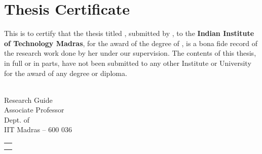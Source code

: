 \xclearpage%
\setcounter{page}{1}

\def\certheadingstr{Thesis Certificate}%
\chapter*{\certheadingstr}

\vspace*{0.5in}  

\noindent 
This is to certify that the thesis titled {\bf
  \mythesistitleNOTSYNPOSIS}, submitted by {\bf \myname}, to the {\bf
  Indian Institute of Technology Madras}, for the award of the degree
of {\bf \mydegree}, is a bona fide record of the research work done by
her under our supervision.  The contents of this thesis, in full or in
parts, have not been submitted to any other Institute or University
for the award of any degree or diploma.

\vspace*{1.5in}

\begin{singlespacing}
  \hspace*{-0.25in}
  \parbox{3in}{
     \\
    \small
    \noindent Research Guide\\
    \noindent Associate Professor\\
    \noindent Dept. of \mydept\\
    \noindent IIT Madras -- 600 036 } \hfill
  \parbox{1.25in}{               %
    \small
    \vspace*{0.75in}
    \begin{tabular}[h]{r}
    \noindent {Chennai}\\         
    \noindent {\mythesissubmissiondate} 
    \end{tabular}
  }
\end{singlespacing}
